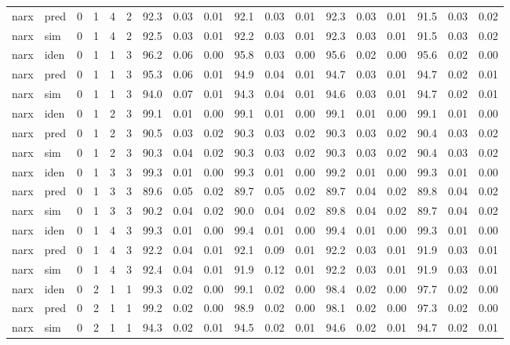 \begin{landscape}
\begin{center}
\begin{longtable}{ll|cccc|ccc|ccc|ccc|ccc}
narx & pred & 0 & 1 & 4 & 2 & 92.3 & 0.03 & 0.01 & 92.1 & 0.03 & 0.01 & 92.3 & 0.03 & 0.01 & 91.5 & 0.03 & 0.02 \\ 
narx & sim  & 0 & 1 & 4 & 2 & 92.5 & 0.03 & 0.01 & 92.2 & 0.03 & 0.01 & 92.3 & 0.03 & 0.01 & 91.5 & 0.03 & 0.02 \\ 
 \hline 
narx & iden & 0 & 1 & 1 & 3 & 96.2 & 0.06 & 0.00 & 95.8 & 0.03 & 0.00 & 95.6 & 0.02 & 0.00 & 95.6 & 0.02 & 0.00 \\ 
narx & pred & 0 & 1 & 1 & 3 & 95.3 & 0.06 & 0.01 & 94.9 & 0.04 & 0.01 & 94.7 & 0.03 & 0.01 & 94.7 & 0.02 & 0.01 \\ 
narx & sim  & 0 & 1 & 1 & 3 & 94.0 & 0.07 & 0.01 & 94.3 & 0.04 & 0.01 & 94.6 & 0.03 & 0.01 & 94.7 & 0.02 & 0.01 \\ 
 \hline 
narx & iden & 0 & 1 & 2 & 3 & 99.1 & 0.01 & 0.00 & 99.1 & 0.01 & 0.00 & 99.1 & 0.01 & 0.00 & 99.1 & 0.01 & 0.00 \\ 
narx & pred & 0 & 1 & 2 & 3 & 90.5 & 0.03 & 0.02 & 90.3 & 0.03 & 0.02 & 90.3 & 0.03 & 0.02 & 90.4 & 0.03 & 0.02 \\ 
narx & sim  & 0 & 1 & 2 & 3 & 90.3 & 0.04 & 0.02 & 90.3 & 0.03 & 0.02 & 90.3 & 0.03 & 0.02 & 90.4 & 0.03 & 0.02 \\ 
 \hline 
narx & iden & 0 & 1 & 3 & 3 & 99.3 & 0.01 & 0.00 & 99.3 & 0.01 & 0.00 & 99.2 & 0.01 & 0.00 & 99.3 & 0.01 & 0.00 \\ 
narx & pred & 0 & 1 & 3 & 3 & 89.6 & 0.05 & 0.02 & 89.7 & 0.05 & 0.02 & 89.7 & 0.04 & 0.02 & 89.8 & 0.04 & 0.02 \\ 
narx & sim  & 0 & 1 & 3 & 3 & 90.2 & 0.04 & 0.02 & 90.0 & 0.04 & 0.02 & 89.8 & 0.04 & 0.02 & 89.7 & 0.04 & 0.02 \\ 
 \hline 
narx & iden & 0 & 1 & 4 & 3 & 99.3 & 0.01 & 0.00 & 99.4 & 0.01 & 0.00 & 99.4 & 0.01 & 0.00 & 99.3 & 0.01 & 0.00 \\ 
narx & pred & 0 & 1 & 4 & 3 & 92.2 & 0.04 & 0.01 & 92.1 & 0.09 & 0.01 & 92.2 & 0.03 & 0.01 & 91.9 & 0.03 & 0.01 \\ 
narx & sim  & 0 & 1 & 4 & 3 & 92.4 & 0.04 & 0.01 & 91.9 & 0.12 & 0.01 & 92.2 & 0.03 & 0.01 & 91.9 & 0.03 & 0.01 \\ 
 \hline 
narx & iden & 0 & 2 & 1 & 1 & 99.3 & 0.02 & 0.00 & 99.1 & 0.02 & 0.00 & 98.4 & 0.02 & 0.00 & 97.7 & 0.02 & 0.00 \\ 
narx & pred & 0 & 2 & 1 & 1 & 99.2 & 0.02 & 0.00 & 98.9 & 0.02 & 0.00 & 98.1 & 0.02 & 0.00 & 97.3 & 0.02 & 0.00 \\ 
narx & sim  & 0 & 2 & 1 & 1 & 94.3 & 0.02 & 0.01 & 94.5 & 0.02 & 0.01 & 94.6 & 0.02 & 0.01 & 94.7 & 0.02 & 0.01 \\ 

\end{longtable}
\end{center}
\end{landscape}
